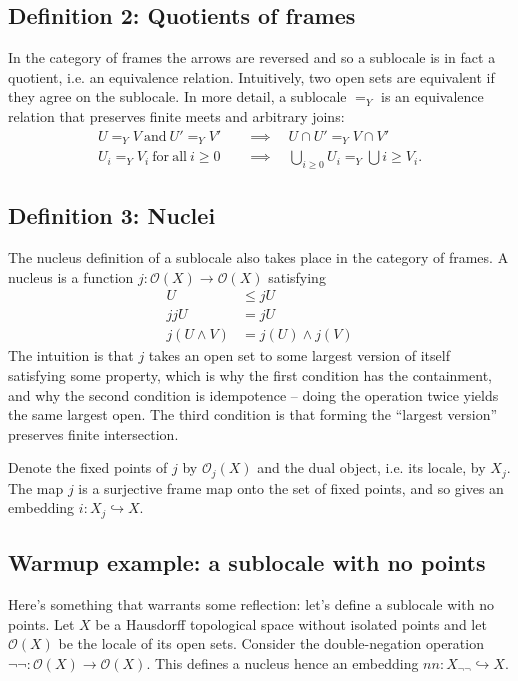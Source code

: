 \documentclass[14pt]{extarticle}
\renewcommand{\o}{\ensuremath{\mathcal{O}}}
\begin{document}
\subsection{Definition 2: Quotients of frames}
In the category of frames the arrows are reversed and so a sublocale is in fact a quotient, i.e. an equivalence relation. Intuitively, two open sets are equivalent if they agree on the sublocale. In more detail, a sublocale $=_Y$ is an equivalence relation that preserves finite meets and arbitrary joins:
\begin{align}
U=_Y V\mathrm{\ and\ }U'=_Y V'&\quad\implies\quad U\cap U'=_Y V\cap V' \\
U_i=_Y V_i\mathrm{\ for\ all\ } i\geq 0&\quad\implies\quad \bigcup_{i\geq 0}U_i =_Y \bigcup{i\geq } V_i.
\end{align}

\subsection{Definition 3: Nuclei}
The nucleus definition of a sublocale also takes place in the category of frames. A nucleus is a function $j:\o(X)\to\o(X)$ satisfying
\begin{align}
U&\leq jU \\
jjU &= jU \\
j(U\wedge V)&=j(U)\wedge j(V)
\end{align}
The intuition is that $j$ takes an open set to some largest version of itself satisfying some property, which is why the first condition has the containment, and why the second condition is idempotence -- doing the operation twice yields the same largest open. The third condition is that forming the ``largest version'' preserves finite intersection.

Denote the fixed points of $j$ by $\o_j(X)$ and the dual object, i.e. its locale, by $X_j$. The map $j$ is a surjective frame map onto the set of fixed points, and so gives an embedding $i:X_j\hookrightarrow X$.

\subsection{Warmup example: a sublocale with no points}
Here's something that warrants some reflection: let's define a sublocale with no points. Let $X$ be a Hausdorff topological space without isolated points and let $\o(X)$ be the locale of its open sets. Consider the double-negation operation $\neg\neg:\o(X)\to\o(X)$. This defines a nucleus hence an embedding $nn:X_{\neg\neg}\hookrightarrow X$.
\end{document}
